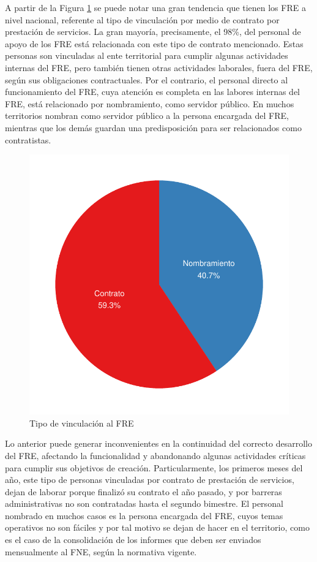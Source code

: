 \documentclass[
]{book}
\begin{document}
A partir de la Figura \ref{fig:pieProfesional2} se puede notar una gran tendencia que tienen los FRE a nivel nacional, referente al tipo de vinculación por medio de contrato por prestación de servicios. La gran mayoría, precisamente, el 98\%, del personal de apoyo de los FRE está relacionada con este tipo de contrato mencionado. Estas personas son vinculadas al ente territorial para cumplir algunas actividades internas del FRE, pero también tienen otras actividades laborales, fuera del FRE, según sus obligaciones contractuales. Por el contrario, el personal directo al funcionamiento del FRE, cuya atención es completa en las labores internas del FRE, está relacionado por nombramiento, como servidor público. En muchos territorios nombran como servidor público a la persona encargada del FRE, mientras que los demás guardan una predisposición para ser relacionados como contratistas.

\begin{figure}
\includegraphics[width=0.85\linewidth]{InformeFinal_files/figure-latex/pieProfesional2-1} \caption{Tipo de vinculación al FRE}\label{fig:pieProfesional2}
\end{figure}

Lo anterior puede generar inconvenientes en la continuidad del correcto desarrollo del FRE, afectando la funcionalidad y abandonando algunas actividades críticas para cumplir sus objetivos de creación. Particularmente, los primeros meses del año, este tipo de personas vinculadas por contrato de prestación de servicios, dejan de laborar porque finalizó su contrato el año pasado, y por barreras administrativas no son contratadas hasta el segundo bimestre. El personal nombrado en muchos casos es la persona encargada del FRE, cuyos temas operativos no son fáciles y por tal motivo se dejan de hacer en el territorio, como es el caso de la consolidación de los informes que deben ser enviados mensualmente al FNE, según la normativa vigente.
\end{document}
